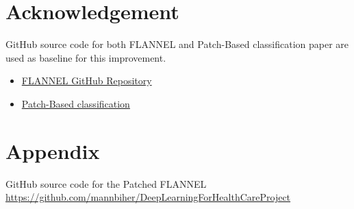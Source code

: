\documentclass{sigkddExp}
\begin{document}
\section{Acknowledgement}
GitHub source code for both FLANNEL and Patch-Based classification
\cite{pmid32396075} paper are used as baseline for this improvement.
\begin{itemize}
    \item \href{https://github.com/qxiaobu/FLANNEL}{FLANNEL GitHub Repository}
    \item \href{https://github.com/jongcye/Deep-Learning-COVID-19-on-CXR-using-Limited-Training-Data-Sets}
          {Patch-Based classification}
\end{itemize}


\section{Appendix}
GitHub source code for the Patched FLANNEL
\url{https://github.com/mannbiher/DeepLearningForHealthCareProject}

\clearpage
%

\end{document}
